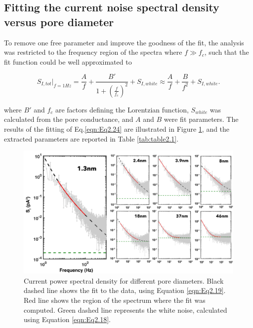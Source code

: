 \subsection{Fitting the current noise spectral density versus pore diameter}\label{sec:S2.4.2}

To remove one free parameter and improve the goodness of the fit, the analysis was restricted to the frequency region of the spectra where $f\gg f_c$, such that the fit function could be well approximated to



\begin{equation}\label{eqn:Eq2.24}
S_{I,tot}|_{f=1Hz}=\frac{A}{f}+\frac{B'}{1+\left(\frac{f}{f_c}\right)^2}+S_{I,white}\approx\frac{A}{f}+\frac{B}{f^2}+S_{I,white}.
\end{equation} 

\noindent where $B'$ and $f_c$ are factors defining the Lorentzian function, $S_{white}$ was calculated from the pore conductance, and $A$ and $B$ were fit parameters. The results of the fitting of Eq.\ref{eqn:Eq2.24} are illustrated in Figure \ref{fig:fig.2.5}, and the extracted parameters are reported in Table \ref{tab:table2.1}.




\begin{figure}[h]
	\centering
	\includegraphics[width=0.95\linewidth]{figures/Figure2.5.png}
	\caption{Current power spectral density for different pore diameters. Black dashed line shows the fit to the data, using Equation \ref{eqn:Eq2.19}. Red line shows the region of the spectrum where the fit was computed. Green dashed line represents the white noise, calculated using Equation \ref{eqn:Eq2.18}.}
	\label{fig:fig.2.5}
\end{figure}



